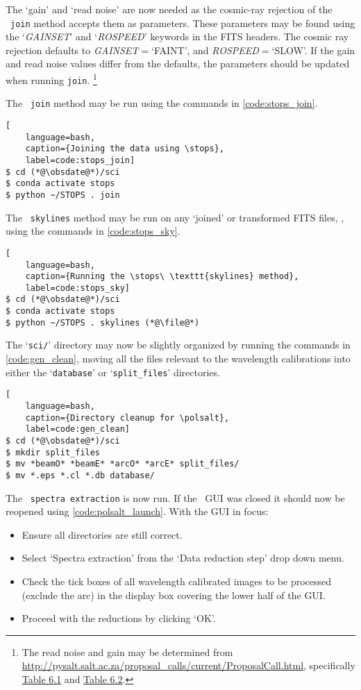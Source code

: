 The `gain' and `read noise' are now needed as the cosmic-ray rejection of the \stops\ \texttt{join} method accepts them as parameters. These parameters may be found using the `\textit{GAINSET}' and `\textit{ROSPEED}' keywords in the \gls{FITS} headers. The cosmic ray rejection defaults to \textit{GAINSET}$ = $`FAINT', and \textit{ROSPEED}$ = $`SLOW'. If the gain and read noise values differ from the defaults, the parameters should be updated when running \texttt{join}.%
\footnote{The read noise and gain may be determined from \protect\url{http://pysalt.salt.ac.za/proposal_calls/current/ProposalCall.html}, specifically \href{http://pysalt.salt.ac.za/proposal_calls/current/ProposalCall.html\#t.4}{Table 6.1} and \href{http://pysalt.salt.ac.za/proposal_calls/current/ProposalCall.html\#t.5}{Table 6.2}.}

The \stops\ \texttt{join} method may be run using the commands in \autoref{code:stops_join}.

\begin{lstlisting}[
    language=bash,
    caption={Joining the data using \stops},
    label=code:stops_join]
$ cd (*@\obsdate@*)/sci
$ conda activate stops
$ python ~/STOPS . join
\end{lstlisting}

The \stops\ \texttt{skylines} method may be run on any `joined' or transformed \gls{FITS} files, \file, using the commands in \autoref{code:stops_sky}.

\begin{lstlisting}[
    language=bash,
    caption={Running the \stops\ \texttt{skylines} method},
    label=code:stops_sky]
$ cd (*@\obsdate@*)/sci
$ conda activate stops
$ python ~/STOPS . skylines (*@\file@*)
\end{lstlisting}

The `\texttt{sci/}' directory may now be slightly organized by running the commands in \autoref{code:gen_clean}, moving all the files relevant to the wavelength calibrations into either the `\texttt{database}' or `\texttt{split\_files}' directories.

\begin{lstlisting}[
    language=bash,
    caption={Directory cleanup for \polsalt},
    label=code:gen_clean]
$ cd (*@\obsdate@*)/sci
$ mkdir split_files
$ mv *beamO* *beamE* *arcO* *arcE* split_files/
$ mv *.eps *.cl *.db database/
\end{lstlisting}

The \polsalt\ \texttt{spectra extraction} is now run. If the \polsalt\ \gls{GUI} was closed it should now be reopened using \autoref{code:polsalt_launch}. With the \gls{GUI} in focus:
\begin{itemize}
    \item Ensure all directories are still correct.
    \item Select `Spectra extraction' from the `Data reduction step' drop down menu.
    \item Check the tick boxes of all wavelength calibrated images to be processed (exclude the arc) in the display box covering the lower half of the \gls{GUI}.
    \item Proceed with the reductions by clicking `OK'.
\end{itemize}

